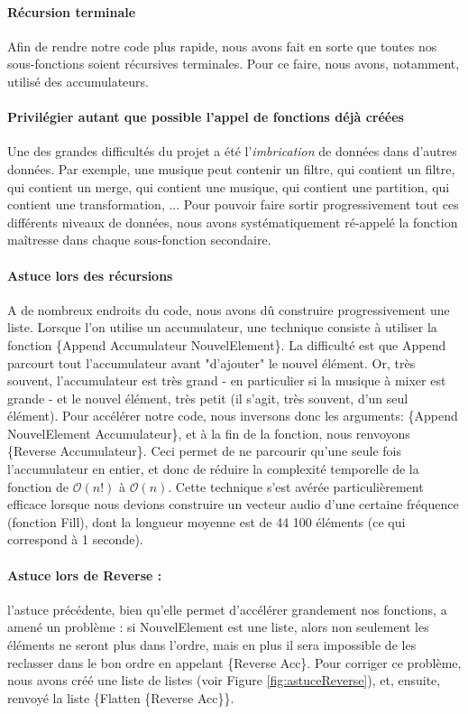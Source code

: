 \documentclass[10pt,a4paper]{article}
\begin{document}
\paragraph{Récursion terminale} 
Afin de rendre notre code plus rapide, nous avons fait en 
sorte que toutes nos sous-fonctions soient récursives terminales. 
Pour ce faire, nous avons, notamment, utilisé des accumulateurs.
 
\paragraph{Privilégier autant que possible l'appel de fonctions déjà créées} 
Une des grandes difficultés du projet a été l'\textit{imbrication} de données dans d'autres données. 
Par exemple, une musique peut contenir un filtre, qui contient un filtre,
qui contient un merge, qui contient une musique, qui contient une partition, qui contient une transformation, ... 
Pour pouvoir faire sortir progressivement tout ces différents niveaux de données, nous avons systématiquement ré-appelé
la fonction maîtresse dans chaque sous-fonction secondaire.

\paragraph{Astuce lors des récursions}
A de nombreux endroits du code, nous avons dû construire progressivement une liste. 
Lorsque l'on utilise un accumulateur, une technique  consiste à utiliser la fonction 
\{Append Accumulateur NouvelElement\}. La difficulté est que Append  parcourt tout 
l'accumulateur avant "d'ajouter" le nouvel élément. Or, très souvent, l'accumulateur 
est très grand - en particulier si la musique à mixer est grande - et le nouvel élément,
très petit (il s'agit, très souvent, d'un seul élément). Pour accélérer notre code, 
nous inversons donc les arguments: \{Append NouvelElement Accumulateur\}, et à la fin 
de la fonction, nous renvoyons \{Reverse Accumulateur\}. Ceci permet de ne parcourir 
qu'une seule fois l'accumulateur en entier, et donc de réduire la complexité temporelle
de la fonction de $\mathcal{O}(n!)$ à $\mathcal{O}(n)$. Cette technique s'est avérée particulièrement efficace
lorsque nous devions construire un vecteur audio d'une certaine fréquence (fonction Fill),
dont la longueur moyenne est de 44 100 éléments (ce qui correspond à 1 seconde).

\paragraph{Astuce lors de Reverse :} 
l'astuce précédente, bien qu'elle permet d'accélérer grandement nos fonctions, a amené un problème :
si NouvelElement est une liste, alors non seulement les éléments ne seront plus dans l'ordre,
mais en plus il sera impossible de les reclasser dans le bon ordre en appelant \{Reverse Acc\}. 
Pour corriger ce problème, nous avons  créé une liste de listes (voir Figure \ref{fig:astuceReverse}), 
et, ensuite, renvoyé la liste \{Flatten \{Reverse Acc\}\}.
\end{document}
